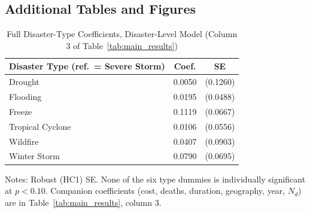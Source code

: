 \documentclass[12pt]{article}
\begin{document}
\subsection{Additional Tables and Figures}

\begin{table}[ht]
\centering
\caption{Full Disaster-Type Coefficients, Disaster-Level Model (Column 3 of Table~\ref{tab:main_results})}
\label{tab:appendix_type_full}
\begin{threeparttable}
\begin{tabular}{lcc}
\toprule
Disaster Type (ref.\ = Severe Storm) & Coef. & SE \\
\midrule
Drought          & 0.0050  & (0.1260) \\
Flooding         & 0.0195  & (0.0488) \\
Freeze           & 0.1119  & (0.0667) \\
Tropical Cyclone & 0.0106  & (0.0556) \\
Wildfire         & 0.0407  & (0.0903) \\
Winter Storm     & 0.0790  & (0.0695) \\
\bottomrule
\end{tabular}
\begin{tablenotes}
\small
\item Notes: Robust (HC1) SE. None of the six type dummies is individually
significant at $p<0.10$. Companion coefficients (cost, deaths, duration,
geography, year, $N_d$) are in Table~\ref{tab:main_results}, column 3.
\end{tablenotes}
\end{threeparttable}
\end{table}
\end{document}
